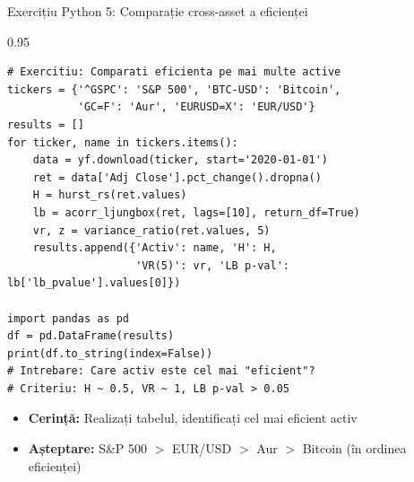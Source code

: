 \documentclass[9pt, aspectratio=169, t]{beamer}
\begin{document}
\begin{frame}[fragile]{Exercițiu Python 5: Comparație cross-asset a eficienței}
    \begin{cminipage}{0.95\textwidth}
\begin{lstlisting}[basicstyle=\ttfamily\scriptsize]
# Exercitiu: Comparati eficienta pe mai multe active
tickers = {'^GSPC': 'S&P 500', 'BTC-USD': 'Bitcoin',
           'GC=F': 'Aur', 'EURUSD=X': 'EUR/USD'}
results = []
for ticker, name in tickers.items():
    data = yf.download(ticker, start='2020-01-01')
    ret = data['Adj Close'].pct_change().dropna()
    H = hurst_rs(ret.values)
    lb = acorr_ljungbox(ret, lags=[10], return_df=True)
    vr, z = variance_ratio(ret.values, 5)
    results.append({'Activ': name, 'H': H,
                    'VR(5)': vr, 'LB p-val': lb['lb_pvalue'].values[0]})

import pandas as pd
df = pd.DataFrame(results)
print(df.to_string(index=False))
# Intrebare: Care activ este cel mai "eficient"?
# Criteriu: H ~ 0.5, VR ~ 1, LB p-val > 0.05
\end{lstlisting}

\vspace{0.1cm}
\begin{itemize}\setlength{\itemsep}{0pt}
    \item \textbf{Cerință:} Realizați tabelul, identificați cel mai eficient activ
    \item \textbf{Așteptare:} S\&P 500 $>$ EUR/USD $>$ Aur $>$ Bitcoin (în ordinea eficienței)
\end{itemize}
    \end{cminipage}
\end{frame}
\end{document}
